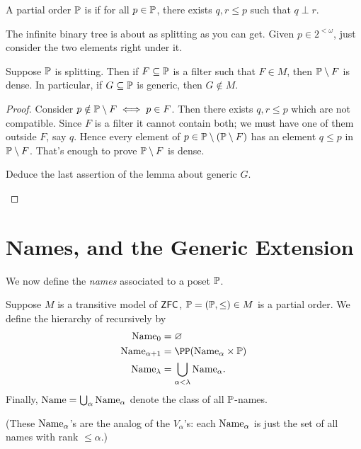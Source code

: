 \begin{definition}
	A partial order $\mathbb P$ is  if
	for all $p \in \mathbb P$, there exists $q,r \le p$
	such that $q \perp r$.
\end{definition}
\begin{example}
	The infinite binary tree is about as splitting as you can get.
	Given $p \in 2^{<\omega}$, just consider the two elements right under it.
\end{example}

\begin{lemma}
	Suppose $\mathbb P$ is splitting.  Then if $F \subseteq \mathbb P$ is a filter
	such that $F \in M$, then $\mathbb P \setminus F$ is dense.
	In particular, if $G \subseteq \mathbb P$ is generic, then $G \notin M$.
\end{lemma}
\begin{proof}
	Consider $p \notin \mathbb P \setminus F \iff p \in F$.
	Then there exists $q, r \le p$ which are not compatible.
	Since $F$ is a filter it cannot contain both;
	we must have one of them outside $F$, say $q$.
	Hence every element of $p \in \mathbb P \setminus (\mathbb P \setminus F)$
	has an element $q \le p$ in $\mathbb P \setminus F$.
	That's enough to prove $\mathbb P \setminus F$ is dense.
	\begin{ques}
		Deduce the last assertion of the lemma about generic $G$. \qedhere
	\end{ques}
\end{proof}

\section{Names, and the Generic Extension}
We now define the \emph{names} associated to a poset $\mathbb P$.

\begin{definition}
	Suppose $M$ is a transitive model of $\mathsf{ZFC}$, $\mathbb P = (\mathbb P, \le) \in M$ is a partial order.
	We define the hierarchy of  recursively by
	\begin{align*}
		\Name_0 &= \varnothing \\
		\Name_{\alpha+1} &= \PP(\Name_\alpha \times \Po) \\
		\Name_{\lambda} &= \bigcup_{\alpha < \lambda} \Name_\alpha.
	\end{align*}
	Finally, $\text{Name} = \bigcup_\alpha \text{Name}_\alpha$ denote the class of all $\mathbb P$-names.
\end{definition}
(These $\text{Name}_\alpha$'s are the analog of the $V_\alpha$'s:
each $\text{Name}_\alpha$ is just the set of all names with rank $\le \alpha$.)


